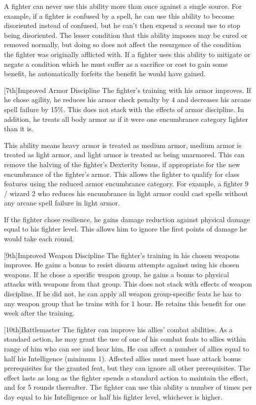 \par A fighter can never use this ability more than once against a single source.
For example, if a fighter is confused by a  spell, he can use this ability to become disoriented instead of confused, but he can't then expend a second use to stop being disoriented.
The lesser condition that this ability imposes may be cured or removed normally, but doing so does not affect the resurgence of the condition the fighter was originally afflicted with.
If a fighter uses this ability to mitigate or negate a condition which he must suffer as a sacrifice or cost to gain some benefit, he automatically forfeits the benefit he would have gained.

[7th]{Improved Armor Discipline}
The fighter's training with his armor improves.
If he chose agility, he reduces his armor check penalty by 4 and decreases his arcane spell failure by 15\%.
This does not stack with the effects of armor discipline.
In addition, he treats all body armor as if it were one encumbrance category lighter than it is.
\par This ability means heavy armor is treated as medium armor, medium armor is treated as light armor, and light armor is treated as being unarmored.
This can remove the halving of the fighter's Dexterity bonus, if appropriate for the new encumbrance of the fighter's armor.
This allows the fighter to qualify for class features using the reduced armor encumbrance category.
For example, a fighter 9 / wizard 2 who reduces his encumbrance in light armor could cast spells without any arcane spell failure in light armor.

If the fighter chose resilience, he gains damage reduction against physical damage equal to his fighter level. This allows him to ignore the first points of damage he would take each round.

[9th]{Improved Weapon Discipline}
The fighter's training in his chosen weapons improves.
He gains a  bonus to resist disarm attempts against using his chosen weapons.
If he chose a specific weapon group, he gains a  bonus to physical attacks with weapons from that group.
This does not stack with effects of weapon discipline.
If he did not, he can apply all weapon group-specific feats he has to any weapon group that he trains with for 1 hour.
He retains this benefit for one week after the training.

[10th]{Battlemaster}
The fighter can improve his allies' combat abilities.
As a standard action, he may grant the use of one of his combat feats to allies within \rngmed range of him who can see and hear him.
He can affect a number of allies equal to half his Intelligence (minimum 1).
Affected allies must meet base attack bonus prerequisites for the granted feat, but they can ignore all other prerequisites.
The effect lasts as long as the fighter spends a standard action to maintain the effect, and for 5 rounds thereafter.
The fighter can use this ability a number of times per day equal to his Intelligence or half his fighter level, whichever is higher.

